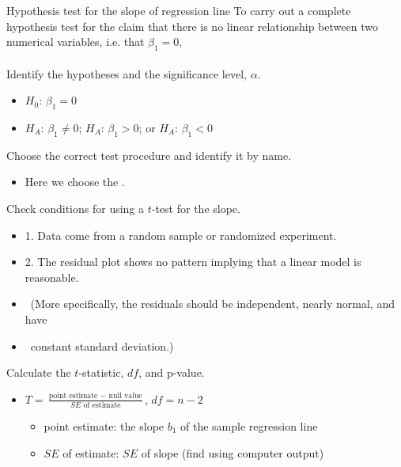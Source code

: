 
\begin{onebox}{Hypothesis test for the slope of regression line}
To carry out a complete hypothesis test for the claim that there is no linear relationship between two numerical variables, i.e. that $\beta_1=0$, 
\\
\\
 Identify the hypotheses and the significance level, $\alpha$.\vspace{-1mm}
\begin{itemize}
\setlength{\itemsep}{0mm}
\item[] $H_0$: $\beta_1 = 0$  
\item[]  $H_A$: $\beta_1 \ne 0$;  \quad $H_A$: $\beta_1 > 0$; \quad or \quad $H_A$: $\beta_1 < 0$ 
\end{itemize} 
 Choose the correct test procedure and identify it by name. \vspace{-1mm}
\begin{itemize}
\item[] Here we choose the . 
\end{itemize}
  Check conditions for using a $t$-test for the slope.\vspace{-1mm}
\begin{itemize}
\setlength{\itemsep}{0mm}
\item[] 1.  Data come from a random sample or randomized experiment.
\item[] 2.  The residual plot shows no pattern implying that a linear model is reasonable. \item[] \quad \ (More specifically, the residuals should be independent, nearly normal, and have  
\item [] \quad \  constant standard deviation.)
\end{itemize}
   Calculate the $t$-statistic, $df$, and p-value.
\begin{itemize}
\item[] $T= \frac{\text{point estimate } - \text{ null value}}{SE \text{ of estimate}}$, \quad $df=n-2$
\begin{itemize}
\item[] point estimate: the slope $b_1$ of the sample regression line
\item[] $SE$ of estimate:  $SE$ of slope (find using computer output)

\end{itemize}
\end{itemize}
\end{onebox}
